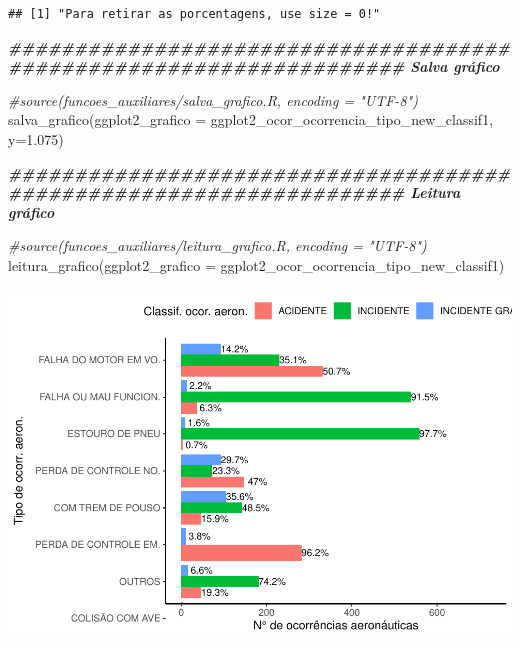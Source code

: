 \documentclass[
]{article}
\newenvironment{Shaded}{\begin{snugshade}}{\end{snugshade}}
\newcommand{\AttributeTok}[1]{\textcolor[rgb]{0.77,0.63,0.00}{#1}}
\newcommand{\CommentTok}[1]{\textcolor[rgb]{0.56,0.35,0.01}{\textit{#1}}}
\newcommand{\DocumentationTok}[1]{\textcolor[rgb]{0.56,0.35,0.01}{\textbf{\textit{#1}}}}
\newcommand{\FloatTok}[1]{\textcolor[rgb]{0.00,0.00,0.81}{#1}}
\newcommand{\FunctionTok}[1]{\textcolor[rgb]{0.00,0.00,0.00}{#1}}
\newcommand{\NormalTok}[1]{#1}
\begin{document}
\begin{verbatim}
## [1] "Para retirar as porcentagens, use size = 0!"
\end{verbatim}

\begin{Shaded}
\begin{Highlighting}[]
\DocumentationTok{\#\#\#\#\#\#\#\#\#\#\#\#\#\#\#\#\#\#\#\#\#\#\#\#\#\#\#\#\#\#\#\#\#\#\#\#\#\#\#\#\#\#\#\#\#\#\#\#\#\#\#\#\#\#\#\#\#\#\#\#\#\#\#\#\#\#\#\# Salva gráfico}

\CommentTok{\#source(\textquotesingle{}funcoes\_auxiliares/salva\_grafico.R\textquotesingle{}, encoding = "UTF{-}8")}
\FunctionTok{salva\_grafico}\NormalTok{(}\AttributeTok{ggplot2\_grafico =}\NormalTok{ ggplot2\_ocor\_ocorrencia\_tipo\_new\_classif1, }\AttributeTok{y=}\FloatTok{1.075}\NormalTok{)}

\DocumentationTok{\#\#\#\#\#\#\#\#\#\#\#\#\#\#\#\#\#\#\#\#\#\#\#\#\#\#\#\#\#\#\#\#\#\#\#\#\#\#\#\#\#\#\#\#\#\#\#\#\#\#\#\#\#\#\#\#\#\#\#\#\#\#\#\#\#\#\#\# Leitura gráfico}

\CommentTok{\#source(\textquotesingle{}funcoes\_auxiliares/leitura\_grafico.R\textquotesingle{}, encoding = "UTF{-}8")}
\FunctionTok{leitura\_grafico}\NormalTok{(}\AttributeTok{ggplot2\_grafico =}\NormalTok{ ggplot2\_ocor\_ocorrencia\_tipo\_new\_classif1)}
\end{Highlighting}
\end{Shaded}

\begin{center}\includegraphics[width=1\linewidth]{../4.Relatorio/pdf/index_files/figure-latex/unnamed-chunk-47-1} \end{center}
\end{document}
